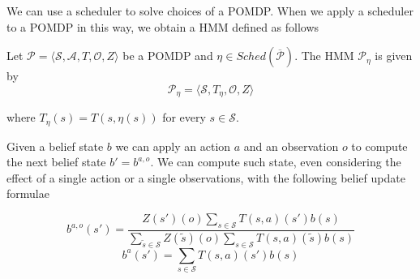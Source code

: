 We can use a scheduler to solve choices of a \ac{POMDP}. When we apply a scheduler to a \ac{POMDP} in this way, we obtain a \ac{HMM} defined as follows

\begin{definition}
	Let $\mathcal{P} = \langle \mathcal{S}, \mathcal{A}, T, \mathcal{O}, Z \rangle$ be a \ac{POMDP} and $\eta \in Sched(\overline{\mathcal{P}})$. The \ac{HMM} $\mathcal{P}_\eta$ is given by
	\vspace{-.3cm}
$$ \mathcal{P}_\eta = \langle \mathcal{S}, T_\eta, \mathcal{O}, Z \rangle $$

\vspace{-.3cm}
\noindent
where $T_\eta(s) = T(s,\eta(s))$ for every $s \in \mathcal{S}$.
\end{definition}

Given a belief state $b$ we can apply an action $a$ and an observation $o$ to compute the next belief state $b' = b^{a,o}$. We can compute such state, even considering the effect of a single action or a single observations, with the following belief update formulae

\begin{equation}\label{eq:belief_update_ao}
	b^{a,o}(s') = \frac{Z(s')(o)\sum_{s\in \mathcal{S}} T(s,a)(s')b(s)}{\sum_{\tilde{s}\in\mathcal{S}} Z(\tilde{s})(o)\sum_{s\in \mathcal{S}} T(s,a)(\tilde{s})b(s)}
\end{equation}
\begin{equation}\label{eq:belief_update_a}
	b^{a}(s') = \sum_{s\in \mathcal{S}} T(s,a)(s')b(s)
\end{equation}


%



